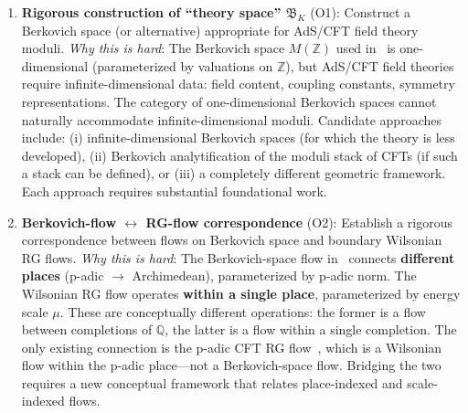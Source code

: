 \documentclass[11pt,a4paper]{article}
\newcommand{\Q}{\mathbb{Q}}
\begin{document}
\begin{enumerate}[leftmargin=2em]
    \item \textbf{Rigorous construction of ``theory space'' $\mathfrak{B}_K$} (O1): Construct a Berkovich space (or alternative) appropriate for AdS/CFT field theory moduli. \textit{Why this is hard}: The Berkovich space $M(\mathbb{Z})$ used in~\cite{HMS20} is one-dimensional (parameterized by valuations on $\mathbb{Z}$), but AdS/CFT field theories require infinite-dimensional data: field content, coupling constants, symmetry representations. The category of one-dimensional Berkovich spaces cannot naturally accommodate infinite-dimensional moduli. Candidate approaches include: (i) infinite-dimensional Berkovich spaces (for which the theory is less developed), (ii) Berkovich analytification of the moduli stack of CFTs (if such a stack can be defined), or (iii) a completely different geometric framework. Each approach requires substantial foundational work.

    \item \textbf{Berkovich-flow $\leftrightarrow$ RG-flow correspondence} (O2): Establish a rigorous correspondence between flows on Berkovich space and boundary Wilsonian RG flows. \textit{Why this is hard}: The Berkovich-space flow in~\cite{HMS20} connects \textbf{different places} (p-adic $\to$ Archimedean), parameterized by p-adic norm. The Wilsonian RG flow operates \textbf{within a single place}, parameterized by energy scale $\mu$. These are conceptually different operations: the former is a flow between completions of $\Q$, the latter is a flow within a single completion. The only existing connection is the p-adic CFT RG flow~\cite{HLM19}, which is a Wilsonian flow within the p-adic place---not a Berkovich-space flow. Bridging the two requires a new conceptual framework that relates place-indexed and scale-indexed flows.


\end{enumerate}
\end{document}
